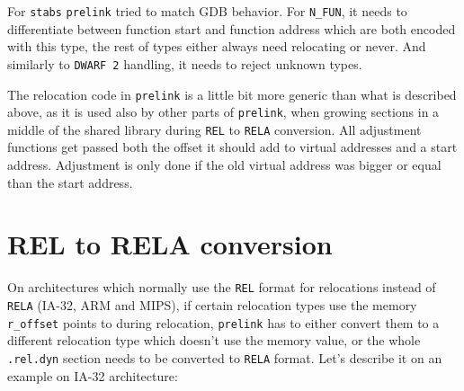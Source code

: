 \documentclass[twoside]{article}
\def\tts#1{\texttt{\small #1}}
\begin{document}
For \tts{stabs} \tts{prelink} tried to match GDB behavior.  For
\tts{N\_FUN}, it needs to differentiate between function start and
function address which are both encoded with this type, the rest of types
either always need relocating or never.  And similarly to \tts{DWARF 2}
handling, it needs to reject unknown types.

The relocation code in \tts{prelink} is a little bit more generic
than what is described above, as it is used also by other parts of
\tts{prelink}, when growing sections in a middle of the shared library
during \tts{REL} to \tts{RELA} conversion.  All adjustment functions
get passed both the offset it should add to virtual addresses and
a start address.  Adjustment is only done if the old virtual address
was bigger or equal than the start address.

\section{REL to RELA conversion}

On architectures which normally use the \tts{REL} format for relocations instead
of \tts{RELA} (IA-32, ARM and MIPS), if certain relocation types use the
memory \tts{r\_offset} points to during relocation, \tts{prelink} has to
either convert them to a different relocation type which doesn't use
the memory value, or the whole \tts{.rel.dyn} section needs to be converted
to \tts{RELA} format.  Let's describe it on an example on IA-32 architecture:
\end{document}
